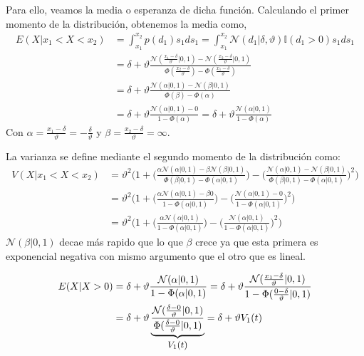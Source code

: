 \documentclass[11pt,twoside,spanish]{report} %
\begin{document}
Para ello, veamos la media o esperanza de dicha funci\'on.
Calculando el primer momento de la distribuci\'on, obtenemos la media como,
\begin{equation}\label{eq:mean_aprox_double}
	\begin{split}
		E(X| x_1 < X < x_2) &=  \int_{x_1}^{x_2} p(d_1)s_1ds_1 = \int_{x_1}^{x_2}  \mathcal{N}(d_1|\delta,\vartheta) \mathbb{I}(d_1 > 0)s_1ds_1 \\
		&= \delta + \vartheta \frac{\mathcal{N}(\frac{x_1-\delta}{\vartheta}|0,1) - \mathcal{N}(\frac{x_2-\delta}{\vartheta}|0,1) }{\Phi(\frac{x_2-\delta}{\vartheta}) - \Phi(\frac{x_1-\delta}{\vartheta}) } \\
		&= \delta +\vartheta \frac{\mathcal{N}(\alpha|0,1) - \mathcal{N}(\beta|0,1) }{\Phi(\beta) - \Phi(\alpha) }\\
		& = \delta + \vartheta \frac{\mathcal{N}(\alpha|0,1) - 0 }{1 - \Phi(\alpha) } = \delta + \vartheta \frac{\mathcal{N}(\alpha|0,1)}{1 - \Phi(\alpha) }
	\end{split}
\end{equation}
Con $\alpha=\frac{x_1-\delta}{\vartheta}=-\frac{\delta}{\vartheta}$ y $\beta=\frac{x_2-\delta}{\vartheta}=\infty$.

La varianza se define mediante el segundo momento de la distribuci\'on como:
\begin{equation}\label{eq:variance_aprox_double}
	\begin{split}
		V(X| x_1 < X < x_2) &= \vartheta^2 \Bigg( 1 + \bigg(\frac{\alpha \mathcal{N}(\alpha|0,1) - \beta \mathcal{N}(\beta|0,1) }{\Phi(\beta|0,1) - \Phi(\alpha|0,1) }\bigg) - \bigg(\frac{\mathcal{N}(\alpha|0,1) - \mathcal{N}(\beta|0,1) }{\Phi(\beta|0,1) - \Phi(\alpha|0,1) }\bigg)^2 \Bigg)\\
		&=\vartheta^2 \Bigg( 1 + \bigg(\frac{\alpha \mathcal{N}(\alpha|0,1) - \beta 0 }{1 - \Phi(\alpha|0,1) }\bigg) - \bigg(\frac{\mathcal{N}(\alpha|0,1) - 0 }{1 - \Phi(\alpha|0,1) }\bigg)^2 \Bigg)\\
		&=\vartheta^2 \Bigg( 1 + \bigg(\frac{\alpha \mathcal{N}(\alpha|0,1)}{1 - \Phi(\alpha|0,1) }\bigg) - \bigg(\frac{\mathcal{N}(\alpha|0,1) }{1 - \Phi(\alpha|0,1) }\bigg)^2 \Bigg)
	\end{split}
\end{equation}
$\mathcal{N}(\beta|0,1)$ decae m\'as rapido que lo que $\beta$ crece ya que esta primera es exponencial negativa con mismo argumento que el otro que es lineal.



\begin{equation}\label{eq:mean_aprox_}
	\begin{split}
		E(X|  X > 0)  &= \delta + \vartheta \frac{\mathcal{N}(\alpha|0,1)}{1 - \Phi(\alpha|0,1) } = \delta + \vartheta \frac{\mathcal{N}(\frac{x_1-\delta}{\vartheta}|0,1)}{1 - \Phi(\frac{0-\delta}{\vartheta}|0,1) }\\
		& = \delta + \vartheta \underbrace{\frac{\mathcal{N}(\frac{\delta-0}{\vartheta}|0,1)}{\Phi(\frac{\delta-0}{\vartheta}|0,1) }}_{\text{\small $V_1(t)$} } = \delta + \vartheta V_1(t)
	\end{split}
\end{equation}
\end{document}
